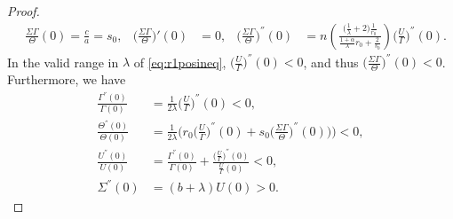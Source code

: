 \documentclass[a4paper,11pt]{article}
\begin{document}
\begin{proof}
\begin{align*}
&\frac{\Sigma\Gamma}{\Theta}(0) = \frac{c}{a} = s_0,  & \Big(\frac{\Sigma\Gamma}{\Theta}\Big)'(0)&=0, &
\Big(\frac{\Sigma\Gamma}{\Theta}\Big)^{''}(0) &= n \left(\frac{ \big(\frac{1}{\lambda}+2\big) \frac{1}{r_0} }{ \frac{1+\alpha}{\lambda}r_0 + \frac{2}{s_0}}\right)\Big(\frac{U}{\Gamma}\Big)^{''}(0).
\end{align*}
In the valid range in $\lambda$ of \eqref{eq:r1posineq}, $\displaystyle \Big(\frac{U}{\Gamma}\Big)^{''}(0) <0$, and thus $\displaystyle \Big(\frac{\Sigma\Gamma}{\Theta}\Big)^{''}(0) <0$.
Furthermore, we have
\begin{equation} \label{eq:second_der}
\begin{aligned}
\frac{\Gamma^{''}(0)}{\Gamma(0)} &= \frac{1}{2\lambda}\Big(\frac{U}{\Gamma}\Big)^{''}(0) < 0,\\
\frac{\Theta^{''}(0)}{\Theta(0)} &= \frac{1}{2\lambda}\Big(r_0\Big(\frac{U}{\Gamma}\Big)^{''}(0) + s_0\Big(\frac{\Sigma\Gamma}{\Theta}\Big)^{''}(0)\Big)\Big)  < 0,\\
\frac{U^{''}(0)}{U(0)} &=\frac{\Gamma^{''}(0)}{\Gamma(0)} + \frac{ \big(\frac{U}{\Gamma}\big)^{''}(0)}{\frac{U}{\Gamma}(0)}< 0,\\
\Sigma^{''}(0)&=(b+\lambda)U(0)>0.
\end{aligned}
\end{equation}


\end{proof}
\end{document}
